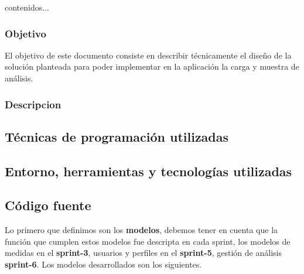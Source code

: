 
	contenidos...



\subsubsection{Objetivo}
El objetivo de este documento consiste en describir técnicamente el diseño de la solución planteada para poder implementar en la aplicación la carga y muestra de análisis.

\subsubsection{Descripcion}%



\subsection{Técnicas de programación utilizadas}
\subsection{Entorno, herramientas y tecnologías utilizadas}
\subsection{Código fuente}

Lo primero que definimos son los \textbf{modelos}, debemos tener en cuenta que la función que cumplen estos modelos fue descripta en cada sprint, los modelos de medidas en el \textbf{sprint-3}, usuarios y perfiles en el \textbf{sprint-5}, gestión de análisis \textbf{sprint-6}. Los modelos desarrollados son los siguientes.

